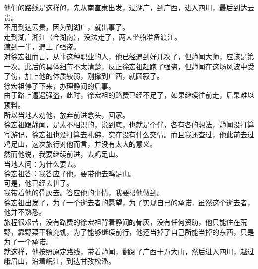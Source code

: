 \begin{multicols}{\theparacolNo}
他们的路线是这样的，先从南直隶出发，过湖广，到广西，进入四川，最后到达云贵。\\

不用到达云贵，因为到湖广，就出事了。\\

走到湖广湘江（今湖南），没法走了，两人坐船准备渡江。\\

渡到一半，遇上了强盗。\\

对徐宏祖而言，从事这种职业的人，他已经遇到好几次了，但静闻大师，应该是第一次。此后的具体细节不太清楚，反正徐宏祖赶跑了强盗，但静闻在这场风波中受了伤，加上他的体质较弱，刚撑到广西，就圆寂了。\\

徐宏祖停了下来，办理静闻的后事。\\

由于路上遭遇强盗，此时，徐宏祖的路费已经不足了，如果继续往前走，后果难以预料。\\

所以当地人劝他，放弃前进念头，回家。\\

徐宏祖跟静闻，是素不相识的，说到底，也就是个伴，各有各的想法，静闻没打算写游记，徐宏祖也没打算去礼佛，实在没有什么交情。而且我还查过，他此前去过鸡足山，这次旅行对他而言，并没有太大的意义。\\

然而他说，我要继续前进，去鸡足山。\\

当地人问：为什么要去。\\

徐宏祖答：我答应了他，要带他去鸡足山。\\

可是，他已经去世了。\\

我带着他的骨灰去。答应他的事情，我要帮他做到。\\

徐宏祖出发了，为了一个逝去者的愿望，为了实现自己的承诺，虽然这个逝去者，他并不熟悉。\\

旅程很艰苦，没有路费的徐宏祖背着静闻的骨灰，没有任何资助，他只能住在荒野，靠野菜干粮充饥，为了能够继续前行，他还当掉了自己所能当掉的东西，只是为了一个承诺。\\

就这样，他按照原定路线，带着静闻，翻阅了广西十万大山，然后进入四川，越过峨眉山，沿着岷江，到达甘孜松潘。\\


\end{multicols}
